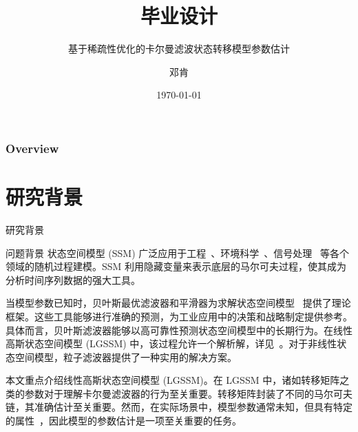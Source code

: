 \documentclass[presentation,aspectratio=169]{ctexbeamer}
\title{毕业设计} %
\subtitle{基于稀疏性优化的卡尔曼滤波状态转移模型参数估计}
\author{邓肯} %
\institute %
{
数学学院 \\ %
\medskip
202130320311@mail.scut.edu.cn %
}
\date{\today} %
\begin{document}
\begin{frame}
\titlepage %
\end{frame}

\begin{frame}
\frametitle{Overview} %
\tableofcontents %
\end{frame}


\section{研究背景}

\begin{frame}
\Huge{\centerline{\textcolor{covblue}{研究背景}}}
\end{frame}

\begin{frame}{问题背景}
状态空间模型 (SSM) 广泛应用于工程~\cite{hamilton1994state, kim2017state}、环境科学~\cite{choi2023urban_phd_environ}、信号处理~\cite{dabush2024kalman_tracking_network_dynamic} 等各个领域的随机过程建模。SSM 利用隐藏变量来表示底层的马尔可夫过程，使其成为分析时间序列数据的强大工具。
\vspace{8pt}
\pause

当模型参数已知时，贝叶斯最优滤波器和平滑器为求解状态空间模型~\cite{Särkkä_Svensson_2023_textbook} 提供了理论框架。这些工具能够进行准确的预测，为工业应用中的决策和战略制定提供参考。具体而言，贝叶斯滤波器能够以高可靠性预测状态空间模型中的长期行为。在线性高斯状态空间模型 (LGSSM) 中，该过程允许一个解析解，详见~\cite{Särkkä_Svensson_2023_textbook}。对于非线性状态空间模型，粒子滤波器提供了一种实用的解决方案。
\vspace{8pt}
\pause

本文重点介绍线性高斯状态空间模型 (LGSSM)。在 LGSSM 中，诸如转移矩阵之类的参数对于理解卡尔曼滤波器的行为至关重要。转移矩阵封装了不同的马尔可夫链，其准确估计至关重要。然而，在实际场景中，模型参数通常未知，但具有特定的属性~\cite{watts1998collective}，因此模型的参数估计是一项至关重要的任务。
\end{frame}
\end{document}
